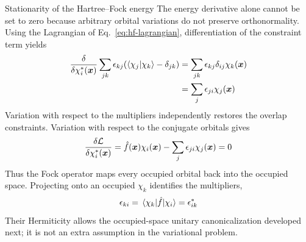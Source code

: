 \documentclass[11pt,a4paper,titlepage]{article}
\numberwithin{equation}{section}
\newcommand{\bx}{\boldsymbol{x}}
\newcommand{\hf}{\Hat{f}}
\begin{document}
\begin{hfsolution}{Stationarity of the Hartree--Fock energy}
The energy derivative alone cannot be set to zero because arbitrary orbital
variations do not preserve orthonormality. Using the Lagrangian of
Eq.~\eqref{eq:hf-lagrangian}, differentiation of the constraint term yields
\begin{equation}
\begin{split}
  \fdv{}{\chi_i^*(\bx)}
    \sum_{jk}\epsilon_{kj}\qty(\braket{\chi_j}{\chi_k}-\delta_{jk})
  &=\sum_{jk}\epsilon_{kj}\delta_{ij}\chi_k(\bx)
  \\
  &=\sum_j\epsilon_{ji}\chi_j(\bx)
\end{split}
\end{equation}
Variation with respect to the multipliers independently restores the overlap
constraints. Variation with respect to the conjugate orbitals gives
\begin{equation}
  \fdv{\mathcal L}{\chi_i^*(\bx)}
  =\hf(\bx)\chi_i(\bx)-\sum_j\epsilon_{ji}\chi_j(\bx)=0
\end{equation}
Thus the Fock operator maps every occupied orbital back into the occupied
space. Projecting onto an occupied $\chi_k$ identifies the multipliers,
\begin{equation}
  \epsilon_{ki}=\mel{\chi_k}{\hf}{\chi_i}
  =\epsilon_{ik}^*
\end{equation}
Their Hermiticity allows the occupied-space unitary canonicalization
developed next; it is not an extra assumption in the variational problem.


\end{hfsolution}
\end{document}

